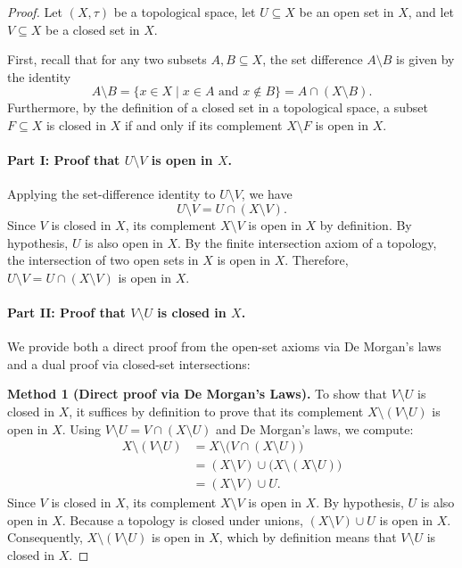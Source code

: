
\begin{proof}
Let $(X,\tau)$ be a topological space, let $U\subseteq X$ be an open set in $X$, and let
$V\subseteq X$ be a closed set in $X$.

First, recall that for any two subsets $A,B\subseteq X$, the set difference $A\setminus B$ is
given by the identity
\[ A\setminus B=\{x\in X\mid x\in A\text{ and }x\notin B\}=A\cap(X\setminus B). \]
Furthermore, by the definition of a closed set in a topological space, a subset $F\subseteq X$
is closed in $X$ if and only if its complement $X\setminus F$ is open in $X$.

\paragraph{Part I: Proof that $U\setminus V$ is open in $X$.}
Applying the set-difference identity to $U\setminus V$, we have
\[ U\setminus V=U\cap(X\setminus V). \]
Since $V$ is closed in $X$, its complement $X\setminus V$ is open in $X$ by definition. By
hypothesis, $U$ is also open in $X$. By the finite intersection axiom of a topology, the
intersection of two open sets in $X$ is open in $X$. Therefore, $U\setminus V=U\cap(X\setminus V)$
is open in $X$.

\paragraph{Part II: Proof that $V\setminus U$ is closed in $X$.}
We provide both a direct proof from the open-set axioms via De Morgan's laws and a dual proof
via closed-set intersections:

\textbf{Method 1 (Direct proof via De Morgan's Laws).} To show that $V\setminus U$ is closed in
$X$, it suffices by definition to prove that its complement $X\setminus(V\setminus U)$ is open
in $X$. Using $V\setminus U=V\cap(X\setminus U)$ and De Morgan's laws, we compute:
\begin{align*}
  X\setminus(V\setminus U) &= X\setminus\big(V\cap(X\setminus U)\big)\\
                           &= (X\setminus V)\cup\big(X\setminus(X\setminus U)\big)\\
                           &= (X\setminus V)\cup U.
\end{align*}
Since $V$ is closed in $X$, its complement $X\setminus V$ is open in $X$. By hypothesis, $U$ is
also open in $X$. Because a topology is closed under unions, $(X\setminus V)\cup U$ is open in
$X$. Consequently, $X\setminus(V\setminus U)$ is open in $X$, which by definition means that
$V\setminus U$ is closed in $X$.


\end{proof}
